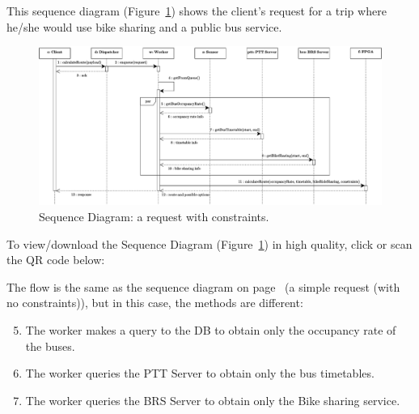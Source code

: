 \documentclass[a4paper]{article}
\begin{document}
    This sequence diagram (Figure~\ref{fig: Sequence Diagram: a request with constraints}) shows the client's request for a trip where he/she would use bike sharing and a public bus service.

    \begin{figure}[!htp]
        \centering
        \includegraphics[width=\textwidth]{img/sequence-diagram-2.pdf}
        \caption{Sequence Diagram: a request with constraints.}
        \label{fig: Sequence Diagram: a request with constraints}
    \end{figure}

    \noindent
    To view/download the Sequence Diagram (Figure~\ref{fig: Sequence Diagram: a request with constraints}) in high quality, click or scan the QR code below:
    \begin{center}
    \end{center}

    \noindent
    The flow is the same as the sequence diagram on page~\pageref{fig: Sequence Diagram: a simple request (no constraints)} (a simple request (with no constraints)), but in this case, the methods are different:
    \begin{enumerate}
        \setcounter{enumi}{4}
        \item The worker makes a query to the DB to obtain only the occupancy rate of the buses.

        \setcounter{enumi}{6}
        \item The worker queries the PTT Server to obtain only the bus timetables.

        \setcounter{enumi}{8}
        \item The worker queries the BRS Server to obtain only the Bike sharing service.
    \end{enumerate}
\end{document}
